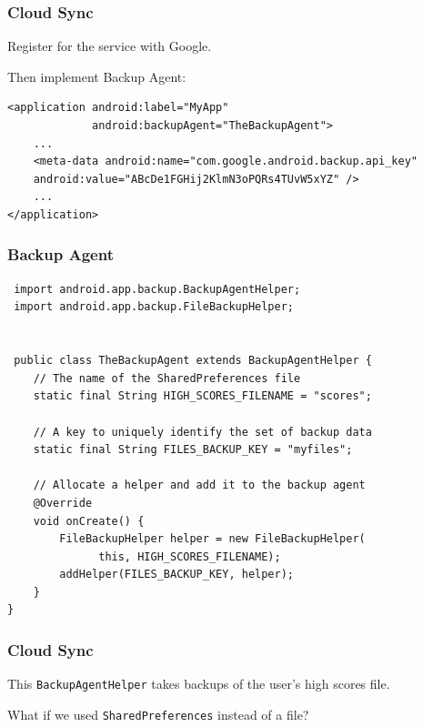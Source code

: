 \begin{frame}[fragile]
\frametitle{Cloud Sync}

\begin{changemargin}{1cm}

Register for the service with Google.

Then implement Backup Agent:
{\scriptsize
\begin{verbatim}
<application android:label="MyApp"
             android:backupAgent="TheBackupAgent">
    ...
    <meta-data android:name="com.google.android.backup.api_key"
    android:value="ABcDe1FGHij2KlmN3oPQRs4TUvW5xYZ" />
    ...
</application>
\end{verbatim}
}

\end{changemargin}
\end{frame}

\begin{frame}[fragile]
\frametitle{Backup Agent}

{\scriptsize
\begin{verbatim}
 import android.app.backup.BackupAgentHelper;
 import android.app.backup.FileBackupHelper;


 public class TheBackupAgent extends BackupAgentHelper {
    // The name of the SharedPreferences file
    static final String HIGH_SCORES_FILENAME = "scores";

    // A key to uniquely identify the set of backup data
    static final String FILES_BACKUP_KEY = "myfiles";

    // Allocate a helper and add it to the backup agent
    @Override
    void onCreate() {
        FileBackupHelper helper = new FileBackupHelper(
              this, HIGH_SCORES_FILENAME);
        addHelper(FILES_BACKUP_KEY, helper);
    }
}
\end{verbatim}
}

\end{frame}

\begin{frame}
\frametitle{Cloud Sync}
\begin{changemargin}{1cm}
This \texttt{BackupAgentHelper} takes backups of the user's high scores file.

What if we used \texttt{SharedPreferences} instead of a file?
\end{changemargin}
\end{frame}


